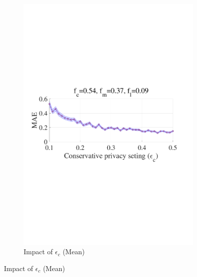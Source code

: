 \documentclass[letterpaper]{article} %
\begin{document}
\begin{figure}[htbp]
\begin{subfigure}[b]{0.23\textwidth}
    \includegraphics[width=\textwidth]{picture/MAEvsEps_average.pdf}
    \caption{Impact of $\epsilon_c$ (Mean)}
    \label{fig:maevsepsilon_c}
  \end{subfigure}



\end{figure}
\end{document}
